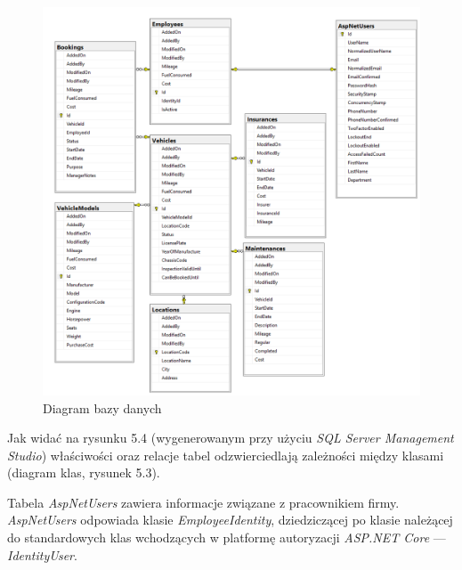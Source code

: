 \documentclass[eng,printmode,openany]{mgr}
\begin{document}
	\newpage
	\begin{figure}[H]
		\centering
		\includegraphics[width=\textwidth]{images/db_diagram.png}
		\caption{Diagram bazy danych}
	\end{figure}
	
	Jak widać na rysunku 5.4 (wygenerowanym przy użyciu \textit{SQL Server Management Studio}) właściwości oraz relacje tabel odzwierciedlają zależności między klasami (diagram klas, rysunek 5.3). 
	
	Tabela \textit{AspNetUsers} zawiera informacje związane z pracownikiem firmy. \textit{AspNetUsers} odpowiada klasie \textit{EmployeeIdentity}, dziedziczącej po klasie należącej do standardowych klas wchodzących w platformę autoryzacji \textit{ASP.NET Core} — \textit{IdentityUser}. 
	
	\newpage
\end{document}
